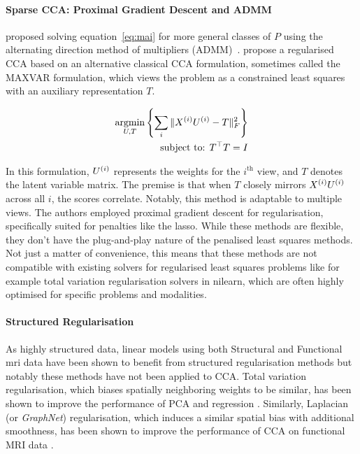 \paragraph{Sparse CCA: Proximal Gradient Descent and ADMM}
\citet{kanatsoulis2018structured} proposed solving equation~\ref{eq:mai} for more general classes of $P$ using the alternating direction method of multipliers (ADMM)~\citep{boyd2011distributed}.
\cite{fu2017scalable} propose a regularised CCA based on an alternative classical CCA formulation, sometimes called the MAXVAR formulation, which views the problem as a constrained least squares with an auxiliary representation $T$\citep{carroll1968generalisation,kettenring1971canonical}.

\begin{align}
    \label{eq:fu}
    \underset{U, T}{\mathrm{argmin}}\left\{\sum_i \|X^{(i)} U^{(i)} - T\|_F^2\right\}\\
    \text{subject to: }T^\top T = I\\
\end{align}

In this formulation, \(U^{(i)}\) represents the \gls{weights} for the $i^{\text{th}}$ view, and \(T\) denotes the latent variable matrix.
The premise is that when \(T\) closely mirrors \(X^{(i)} U^{(i)}\) across all \(i\), the scores correlate.
Notably, this method is adaptable to multiple views.
The authors employed proximal gradient descent for regularisation, specifically suited for penalties like the lasso.
While these methods are flexible, they don't have the plug-and-play nature of the penalised least squares methods.
Not just a matter of convenience, this means that these methods are not compatible with existing solvers for regularised least squares problems like for example total variation regularisation solvers in nilearn, which are often highly optimised for specific problems and modalities.

\paragraph{Structured Regularisation}

As highly structured data, linear models using both Structural and Functional \acrshort{mri} data have been shown to benefit from structured regularisation methods but notably these methods have not been applied to CCA.
Total variation regularisation, which biases spatially neighboring weights to be similar, has been shown to improve the performance of PCA \citep{de2017structured} and regression \citep{michel2011total,dohmatob2014benchmarking, baldassarre2012structured}.
Similarly, Laplacian (or \textit{GraphNet}) regularisation, which induces a similar spatial bias with additional smoothness, has been shown to improve the performance of CCA on functional MRI data \citep{grosenick2013interpretable}.

